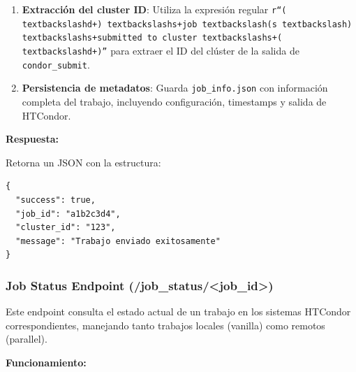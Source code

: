 \begin{enumerate}
	\item \textbf{Extracción del cluster ID}: Utiliza la expresión regular \texttt{r``(\\textbackslash{}d+)\\textbackslash{}s+job\\textbackslash{}(s\\textbackslash{})\\textbackslash{}s+submitted to cluster\\textbackslash{}s+(\\textbackslash{}d+)''} para extraer el ID del clúster de la salida de \texttt{condor\_submit}.

	\item \textbf{Persistencia de metadatos}: Guarda \texttt{job\_info.json} con información completa del trabajo, incluyendo configuración, timestamps y salida de HTCondor.
\end{enumerate}

\textbf{Respuesta:}

Retorna un JSON con la estructura:

\begin{verbatim}
{
  "success": true,
  "job_id": "a1b2c3d4", 
  "cluster_id": "123",
  "message": "Trabajo enviado exitosamente"
}
\end{verbatim}

\subsubsection{Job Status Endpoint (/job\_status/<job\_id>)}
\noindent

Este endpoint consulta el estado actual de un trabajo en los sistemas HTCondor correspondientes, manejando tanto trabajos locales (vanilla) como remotos (parallel).

\textbf{Funcionamiento:}

